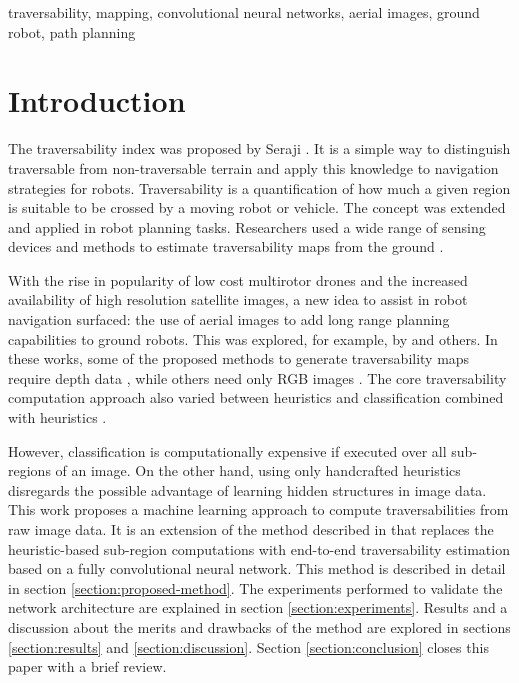 \documentclass[conference]{IEEEtran}
\begin{document}
\begin{IEEEkeywords}
traversability, mapping, convolutional neural networks, aerial images, ground robot, path planning
\end{IEEEkeywords}

\section{Introduction}

The traversability index was proposed by Seraji \cite{seraji:1999}.
It is a simple way to distinguish traversable from non-traversable terrain and apply this knowledge to navigation strategies for robots.
Traversability is a quantification of how much a given region is suitable to be crossed by a moving robot or vehicle.
The concept was extended and applied in robot planning tasks.
Researchers used a wide range of sensing devices and methods to estimate traversability maps from the ground \cite{howard:2001,howard:2003,castejon:2005,guo:2008,shneier:2008}.

With the rise in popularity of low cost multirotor drones and the increased availability of high resolution satellite images, a new idea to assist in robot navigation surfaced: the use of aerial images to add long range planning capabilities to ground robots.
This was explored, for example, by \cite{vandapel:2006,hudjakov:2013,delmerico:2017,chavez-garcia:2017,borges:2019} and others.
In these works, some of the proposed methods to generate traversability maps require depth data \cite{vandapel:2006,chavez-garcia:2017}, while others need only RGB images \cite{hudjakov:2013,delmerico:2017,borges:2019}.
The core traversability computation approach also varied between heuristics \cite{vandapel:2006,borges:2019} and classification combined with heuristics \cite{hudjakov:2013,delmerico:2017}.

However, classification is computationally expensive if executed over all sub-regions of an image.
On the other hand, using only handcrafted heuristics disregards the possible advantage of learning hidden structures in image data.
This work proposes a machine learning approach to compute traversabilities from raw image data.
It is an extension of the method described in \cite{borges:2019} that replaces the heuristic-based sub-region computations with end-to-end traversability estimation based on a fully convolutional neural network.
This method is described in detail in section \ref{section:proposed-method}.
The experiments performed to validate the network architecture are explained in section \ref{section:experiments}.
Results and a discussion about the merits and drawbacks of the method are explored in sections \ref{section:results} and \ref{section:discussion}.
Section \ref{section:conclusion} closes this paper with a brief review.
\end{document}
